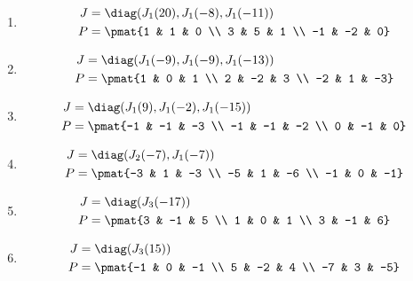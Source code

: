 \begin{enumerate}
\item

\begin{align*}
J &= \diag(J_{1}(20), J_{1}(-8), J_{1}(-11))\\
P &= \pmat{1 & 1 & 0 \\ 3 & 5 & 1 \\ -1 & -2 & 0}
\end{align*}

\item

\begin{align*}
J &= \diag(J_{1}(-9), J_{1}(-9), J_{1}(-13))\\
P &= \pmat{1 & 0 & 1 \\ 2 & -2 & 3 \\ -2 & 1 & -3}
\end{align*}

\item

\begin{align*}
J &= \diag(J_{1}(9), J_{1}(-2), J_{1}(-15))\\
P &= \pmat{-1 & -1 & -3 \\ -1 & -1 & -2 \\ 0 & -1 & 0}
\end{align*}

\item

\begin{align*}
J &= \diag(J_{2}(-7), J_{1}(-7))\\
P &= \pmat{-3 & 1 & -3 \\ -5 & 1 & -6 \\ -1 & 0 & -1}
\end{align*}

\item

\begin{align*}
J &= \diag(J_{3}(-17))\\
P &= \pmat{3 & -1 & 5 \\ 1 & 0 & 1 \\ 3 & -1 & 6}
\end{align*}

\item

\begin{align*}
J &= \diag(J_{3}(15))\\
P &= \pmat{-1 & 0 & -1 \\ 5 & -2 & 4 \\ -7 & 3 & -5}
\end{align*}


\end{enumerate}
